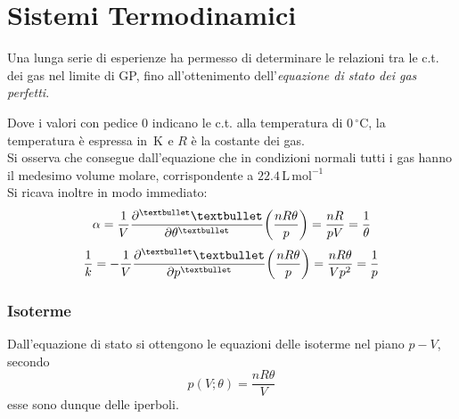 \documentclass[10pt, oneside]{book}
\newcommand{\celsius}{\, \mathrm{{}^\circ C}}
\newcommand{\kelvin}[1]{\, \mathrm{K^{#1}}}
\begin{document}
\chapter{Sistemi Termodinamici}
Una lunga serie di esperienze ha permesso di determinare le relazioni tra le c.t. dei gas nel limite di GP, fino all'ottenimento dell'\textit{equazione di stato dei gas perfetti}.
\begin{center}
\end{center}
Dove i valori con pedice $0$ indicano le c.t. alla temperatura di $0 \celsius$, la temperatura è espressa in $\kelvin{}$ e $R$ è la costante dei gas.
\\Si osserva che consegue dall'equazione che in condizioni normali tutti i gas hanno il medesimo volume molare, corrispondente a $22.4 \, \mathrm{L \, mol^{-1}}$
\\Si ricava inoltre in modo immediato:
\[\alpha = \frac{1}{V} \pdv[•]{•}{\theta} \bigg(\frac{nR \theta}{p}\bigg) = \frac{nR}{pV}= \frac{1}{\theta}\]
\[\frac{1}{k} = - \frac{1}{V} \pdv[•]{•}{p} \bigg(\frac{nR\theta}{p}\bigg) = \frac{nR\theta}{V p^2} = \frac{1}{p}\]

\subsection{Isoterme}
Dall'equazione di stato si ottengono le equazioni delle isoterme nel piano $p-V$, secondo
\[p(V; \theta) = \frac{nR\theta}{V}\]
esse sono dunque delle iperboli. 
\end{document}
